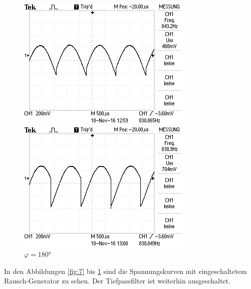 \begin{figure}[!h]
\begin{minipage}[t]{0.3\textwidth}
\includegraphics[width=\textwidth]{Bilder/Rausch270.jpg}
\caption{$\varphi = 180\si{\degree}$}
\label{fig:11}
\end{minipage}
\hspace{12pt}
\vspace{5pt}
\begin{minipage}[t]{0.3\textwidth}
\includegraphics[width=\textwidth]{Bilder/Rausch315.jpg}
\caption{$\varphi = 180\si{\degree}$}
\label{fig:12}
\end{minipage}
\hspace{12pt}
\vspace{5pt}
\end{figure}

In den Abbildungen \ref{fig:7} bis \ref{fig:12} sind die Spannungskurven mit
eingeschaltetem Rausch-Generator zu sehen. Der Tiefpassfilter ist weiterhin ausgeschaltet. \\

